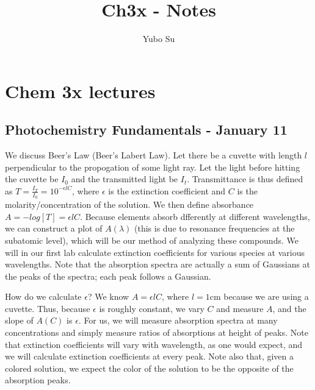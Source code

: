 \documentclass{report}
\begin{document}
\title{Ch3x - Notes}
\author{Yubo Su}
\date{ }

\maketitle

\tableofcontents

\chapter{Chem 3x lectures}

\section{Photochemistry Fundamentals - January 11}

We discuss Beer's Law (Beer's Labert Law). Let there be a cuvette with length $l$ perpendicular to the propogation of some light ray. Let the light before hitting the cuvette be $I_0$ and the transmitted light be $I_t$. Transmittance is thus defined as $T = \frac{I_T}{I_0} = 10^{-\epsilon l C}$, where $\epsilon$ is the extinction coefficient and $C$ is the molarity/concentration of the solution. We then define absorbance $A = -log[T] = \epsilon l C$. Because elements absorb dfferently at different wavelengths, we can construct a plot of $A(\lambda)$ (this is due to resonance frequencies at the subatomic level), which will be our method of analyzing these compounds. We will in our first lab calculate extinction coefficients for various species at various wavelengths. Note that the absorption spectra are actually a sum of Gaussians at the peaks of the spectra; each peak follows a Gaussian. 

How do we calculate $\epsilon$? We know $A = \epsilon lC$, where $l = 1$cm because we are using a cuvette. Thus, because $\epsilon$ is roughly constant, we vary $C$ and measure $A$, and the slope of $A(C)$ is $\epsilon$. For us, we will measure absorption spectra at many concentrations and simply measure ratios of absorptions at height of peaks. Note that extinction coefficients will vary with wavelength, as one would expect, and we will calculate extinction coefficients at every peak. Note also that, given a colored solution, we expect the color of the solution to be the opposite of the absorption peaks.
\end{document}
